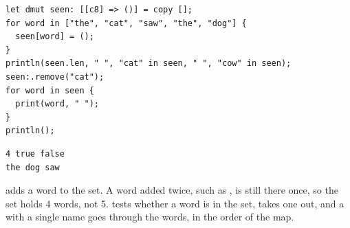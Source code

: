 \begin{lstlisting}[style=coloredverbatim]
let dmut seen: [[c8] => ()] = copy [];
for word in ["the", "cat", "saw", "the", "dog"] {
  seen[word] = ();
}
println(seen.len, " ", "cat" in seen, " ", "cow" in seen);
seen:.remove("cat");
for word in seen {
  print(word, " ");
}
println();
\end{lstlisting}
\vspace{-10pt}%
\begin{lstlisting}[style=bashVerb]
4 true false
the dog saw
\end{lstlisting}

 adds a word to the set. A word added twice, such as
, is still there once, so the set holds 4 words, not 5.
 tests whether a word is in the set,  takes one out,
and a  with a single name goes through the words, in the order of
the map.
